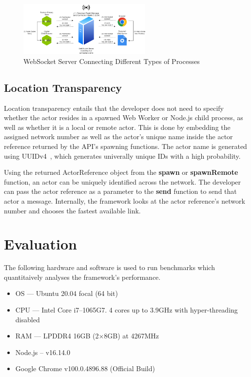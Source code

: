 \documentclass[lettersize,journal]{IEEEtran}
\begin{document}
\begin{figure}[H]
    \begin{centering}
        \includegraphics[width=250px]{resources/websocketconnectioncomplex.png}
        \caption{WebSocket Server Connecting Different Types of Processes}\label{fig:websocketconnectioncomplex}
    \end{centering}
\end{figure}
\subsection{Location Transparency}
Location transparency entails that the developer does not need to specify whether the actor resides in a spawned Web Worker or Node.js child process, as well as whether it is a local or remote actor. This is done by embedding the assigned network number as well as the actor's unique name inside the actor reference returned by the API's spawning functions. The actor name is generated using UUIDv4~\cite{uuidv4}, which generates univerally unique IDs with a high probability. 

Using the returned ActorReference object from the \textbf{spawn} or \textbf{spawnRemote} function, an actor can be uniquely identified across the network. The developer can pass the actor reference as a parameter to the \textbf{send} function to send that actor a message. Internally, the framework looks at the actor reference's network number and chooses the fastest available link. 
\section{Evaluation}
The following hardware and software is used to run benchmarks which quantitaively analyses the framework's performance.
\begin{itemize}
    \item OS --- Ubuntu 20.04 focal (64 bit)
    \item CPU --- Intel Core i7--1065G7. 4 cores up to 3.9GHz with hyper-threading disabled
    \item RAM --- LPDDR4 16GB (2$\times$8GB) at 4267MHz
    \item Node.js – v16.14.0
    \item Google Chrome v100.0.4896.88 (Official Build)
\end{itemize}
\end{document}
